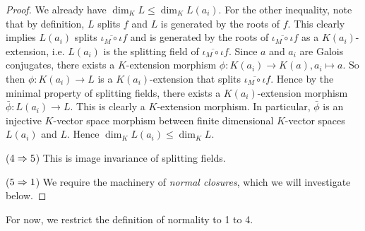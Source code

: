 \documentclass[../book.tex]{subfiles}
\begin{document}
\begin{proof}
        We already have $\dim_K L \leq \dim_K L(a_i)$.
        For the other inequality, note that by definition, 
        $L$ splits $f$ and $L$ is generated by the roots of $f$. 
        This clearly implies $L(a_i)$ splits $\overline{\iota_M \circ \iota} f$
        and is generated by the roots of $\overline{\iota_M \circ \iota} f$
        as a $K(a_i)$-extension, i.e.
        $L(a_i)$ is the splitting field of $\overline{\iota_M\circ\iota} f$.
        Since $a$ and $a_i$ are Galois conjugates, 
        there exists a $K$-extension morphism $\phi : K(a_i) \to K(a), a_i \mapsto a$.
        So then $\phi : K(a_i) \to L$ is a $K(a_i)$-extension that splits
        $\overline{\iota_M\circ\iota} f$. 
        Hence by the minimal property of splitting fields, 
        there exists a $K(a_i)$-extension morphism $\bar\phi : L(a_i) \to L$. 
        This is clearly a $K$-extension morphism. 
        In particular, $\bar\phi$ is an injective $K$-vector space morphism
        between finite dimensional $K$-vector spaces $L(a_i)$ and $L$. 
        Hence $\dim_K L(a_i) \leq \dim_K L$. 
        
    ($4 \Rightarrow 5$)
        This is image invariance of splitting fields.
    
    ($5 \Rightarrow 1$)
        We require the machinery of \emph{normal closures}, which we will investigate below.
\end{proof}

For now, we restrict the definition of normality to 1 to 4. 
\end{document}
